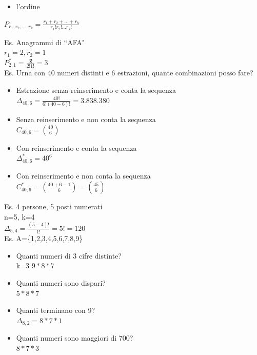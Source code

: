 \documentclass{report}
\begin{document}
\begin{itemize}
        \begin{itemize}
          \item l'ordine\\
        \end{itemize}
        \begin{center}
          $P_{r_1,r_2,...,r_k} = \frac{r_1+r_2+...+r_k}{r_1!r_2!...r_k!}$
        \end{center}
        Es. Anagrammi di ``AFA"\\
        $r_1=2, r_2=1$\\
        $P_{2,1} ^* = \frac{3!}{2!1!} = 3$\\
        Es. Urna con 40 numeri distinti e 6 estrazioni, quante combinazioni posso fare?\\
        \begin{itemize}
          \item Estrazione senza reinserimento e conta la sequenza\\$\Delta_{40,6} = \frac{40!}{6!(40-6)!} = 3.838.380$
          \item Senza reinserimento e non conta la sequenza\\$C_{40,6} = \binom{40}{6}$
          \item Con reinserimento e conta la sequenza\\$\Delta_{40,6}^* = 40^6$
          \item Con reinserimento e non conta la sequenza\\$C_{40,6}^* = \binom{40+6-1}{6}=\binom{45}{6}$
        \end{itemize}
        Es. 4 persone, 5 posti numerati\\
        n=5, k=4\\
        $\Delta_{5,4}=\frac{(5-4)!}{1!} = 5! = 120$\\
        Es. A=\{1,2,3,4,5,6,7,8,9\} \\
        \begin{itemize}
          \item Quanti numeri di 3 cifre distinte?\\k=3 $9*8*7$
          \item Quanti numeri sono dispari?\\$5*8*7$
          \item Quanti terminano con 9?\\$\Delta_{8,2}=8*7*1$
          \item Quanti numeri sono maggiori di 700?\\$8*7*3$
        \end{itemize}

\end{itemize}
\end{document}
